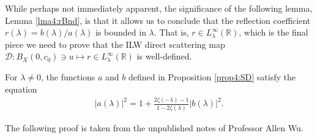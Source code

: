 \documentclass[../dissertation.tex]{subfiles}
\begin{document}
While perhaps not immediately apparent, the significance of the following lemma, 
Lemma \ref{lma4:rBnd}, is that it allows us to conclude 
that the reflection coefficient $r(\lambda) = b(\lambda)/a(\lambda)$ is bounded 
in $\lambda.$ That is, 
$r \in L_\lambda^\infty(\mathbb R)$, which is the final piece we need to prove 
that the ILW direct scattering map \label{sym:DM}
$\mathscr D: B_X(0, c_0) \ni u \mapsto r \in L_\lambda^\infty(\mathbb R)$ is 
well-defined. 

\begin{lma}\label{lma4:rBnd}
	For $\lambda \ne 0$, the functions $a$ and $b$ defined in Proposition \ref{prop4:SD} satisfy
	the equation 
	\begin{align}\label{eq4:rbnd}
		\big| a(\lambda) \big|^2
			= 1 + \frac{2\zeta(-\lambda) - 1}{1 - 2 \zeta(\lambda)} 
				\big| b(\lambda) \big|^2.
	\end{align}
\end{lma}
The following proof is taken from the unpublished notes of Professor Allen Wu.
\end{document}
